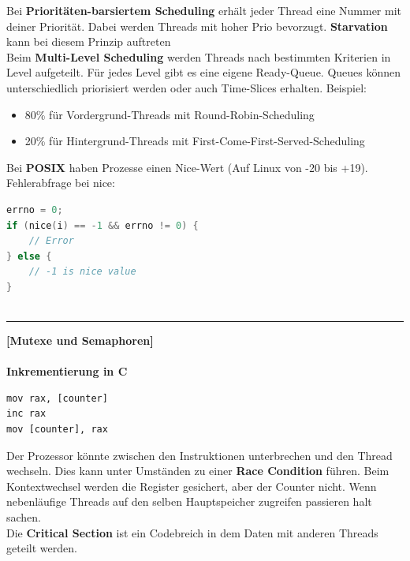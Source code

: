 \documentclass[8pt]{extarticle}
\let\oldtextbf\textbf
\renewcommand{\textbf}{\tiny\oldtextbf}
\begin{document}
\begin{multicols*}{5}
	Bei \textbf{Prioritäten-barsiertem Scheduling} erhält jeder Thread eine Nummer mit deiner Priorität. Dabei werden Threads mit hoher Prio bevorzugt. \textbf{Starvation} kann bei diesem Prinzip auftreten\\
	
	Beim \textbf{Multi-Level Scheduling} werden Threads nach bestimmten Kriterien in Level aufgeteilt. Für jedes Level gibt es eine eigene Ready-Queue. Queues können unterschiedlich priorisiert werden oder auch Time-Slices erhalten. Beispiel:
	\begin{itemize} [noitemsep, topsep=0pt, leftmargin=*]
		\item 80\% für Vordergrund-Threads mit Round-Robin-Scheduling
		\item 20\% für Hintergrund-Threads mit First-Come-First-Served-Scheduling
	\end{itemize}
	
	\vspace{5pt}
	
	Bei \textbf{POSIX} haben Prozesse einen Nice-Wert (Auf Linux von -20 bis +19). Fehlerabfrage bei nice:
	\begin{lstlisting}[language=c]
errno = 0;
if (nice(i) == -1 && errno != 0) {
	// Error
} else {
	// -1 is nice value
}
		
	\end{lstlisting}
	
	\vspace{5pt}
	\rule{\linewidth}{0.4pt}
	\textbf{[Mutexe und Semaphoren]}\\\\
	\textbf{Inkrementierung in C}
	\begin{lstlisting}
mov rax, [counter]
inc rax
mov [counter], rax
	\end{lstlisting}
	Der Prozessor könnte zwischen den Instruktionen unterbrechen und den Thread wechseln. Dies kann unter Umständen zu einer \textbf{Race Condition} führen. Beim Kontextwechsel werden die Register gesichert, aber der Counter nicht. Wenn nebenläufige Threads auf den selben Hauptspeicher zugreifen passieren halt sachen.\\ Die \textbf{Critical Section} ist ein Codebreich in dem Daten mit anderen Threads geteilt werden.\\
	

\end{multicols*}
\end{document}
